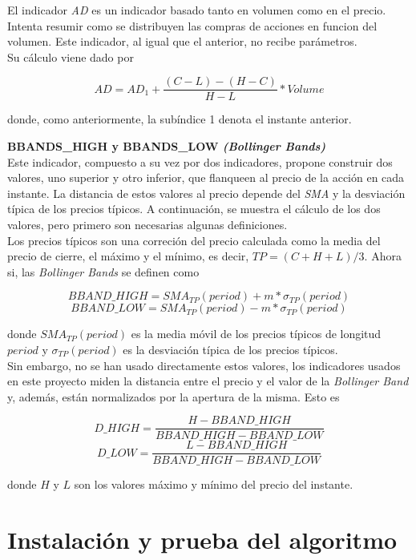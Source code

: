 \begin{appendices}
El indicador \textit{AD} es un indicador basado tanto en volumen como en el precio. Intenta resumir como se distribuyen las compras de acciones en funcion del volumen. Este indicador, al igual que el anterior, no recibe par\'ametros.\\

Su c\'alculo viene dado por

\[AD = AD_{1} + \frac{(C - L) - (H - C)}{H - L}*Volume \]

donde, como anteriormente, la sub\'indice 1 denota el instante anterior.

\vspace{0.5cm}
\noindent\textbf{BBANDS\_HIGH y BBANDS\_LOW \textit{(Bollinger Bands)}}\\

Este indicador, compuesto a su vez por dos indicadores, propone construir dos valores, uno superior y otro inferior, que flanqueen al precio de la acci\'on en cada instante. La distancia de estos valores al precio depende del \textit{SMA} y la desviaci\'on t\'ipica de los precios t\'ipicos. A continuaci\'on, se muestra el c\'alculo de los dos valores, pero primero son necesarias algunas definiciones.\\

Los precios t\'ipicos son una correci\'on del precio calculada como la media del precio de cierre, el m\'aximo y el m\'inimo, es decir, $TP = (C + H + L) / 3$. Ahora si, las \textit{Bollinger Bands} se definen como

\[BBAND\_HIGH = SMA_{TP}(period) + m*\sigma_{TP}(period)\] 
\[BBAND\_LOW = SMA_{TP}(period) - m*\sigma_{TP}(period)\] 

donde $SMA_{TP}(period)$ es la media m\'ovil de los precios t\'ipicos de longitud $period$ y $\sigma_{TP}(period)$ es la desviaci\'on t\'ipica de los precios t\'ipicos.\\

Sin embargo, no se han usado directamente estos valores, los indicadores usados en este proyecto miden la distancia entre el precio y el valor de la \textit{Bollinger Band} y, adem\'as, est\'an normalizados por la apertura de la misma. Esto es

\[D\_HIGH = \frac{H - BBAND\_HIGH}{ BBAND\_HIGH - BBAND\_LOW}\] 
\[D\_LOW =  \frac{L - BBAND\_HIGH}{ BBAND\_HIGH - BBAND\_LOW}\]

donde $H$ y $L$ son los valores m\'aximo y m\'inimo del precio del instante.

\chapter{Instalaci\'on y prueba del algoritmo}


\end{appendices}
